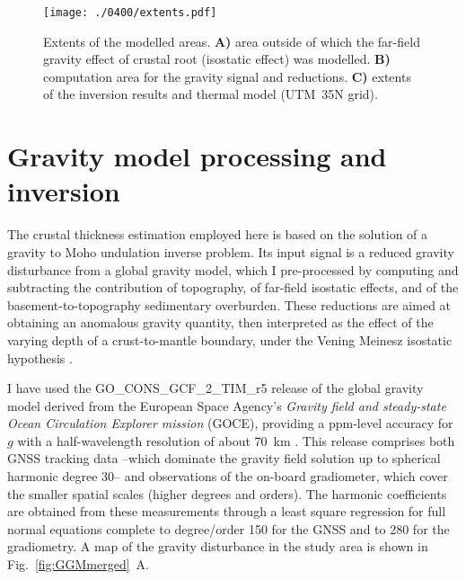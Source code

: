 \begin{figure}[hb]
    \begin{adjustbox}{center}
    \texttt{[image: ./0400/extents.pdf]}
    \end{adjustbox}
    \caption[Gravity modelling: extents of the modelled areas.]{Extents of the modelled areas. \textbf{A)} area outside of which the far-field gravity effect of crustal root (isostatic effect) was modelled. \textbf{B)} computation area for the gravity signal and reductions. \textbf{C)} extents of the inversion results and thermal model (UTM~35N grid).}
	\label{fig:extents}
\end{figure}

\FloatBarrier
\section{Gravity model processing and inversion}
\label{s:Appl:Grav}

The crustal thickness estimation employed here is based on the solution of a gravity to Moho undulation inverse problem.
Its input signal is a reduced gravity disturbance from a global gravity model, which I pre-processed by computing and subtracting the contribution of topography, of far-field isostatic effects, and of the basement-to-topography sedimentary overburden.
These reductions are aimed at obtaining an anomalous gravity quantity, then interpreted as the effect of the varying depth of a crust-to-mantle boundary, under the Vening Meinesz isostatic hypothesis \parencite{VeningMeinesz1931}.

I have used the {GO\_CONS\_GCF\_2\_TIM\_r5} release \parencites{Brockmann2014}{Pail2011GOCE}{GOCETIMr5datasheet} of the global gravity model derived from the European Space Agency's \textit{Gravity field and steady-state Ocean Circulation Explorer mission} (GOCE), providing a ppm-level accuracy for $g$ with a half-wavelength resolution of about 70~\si{\kilo \metre} \parencite{Floberghagen2011_goce}.
This release comprises both GNSS tracking data --which dominate the gravity field solution up to spherical harmonic degree 30-- and observations of the on-board gradiometer, which cover the smaller spatial scales (higher degrees and orders).
The harmonic coefficients are obtained from these measurements through a least square regression for full normal equations complete to degree/order 150 for the GNSS and to 280 for the gradiometry.
A map of the gravity disturbance in the study area is shown in Fig.~\ref{fig:GGMmerged}~A.

